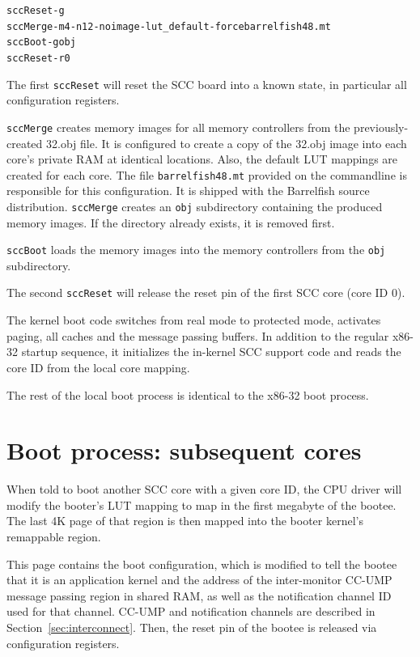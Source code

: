 \documentclass[a4paper,twoside]{report} %
\begin{document}
\begin{alltt}
  sccReset -g
  sccMerge -m4 -n12 -noimage -lut\_default -force barrelfish48.mt
  sccBoot -g obj
  sccReset -r 0
\end{alltt}

The first \texttt{sccReset} will reset the SCC board into a known
state, in particular all configuration registers.

\texttt{sccMerge} creates memory images for all memory controllers
from the previously-created 32.obj file. It is configured to create a
copy of the 32.obj image into each core's private RAM at identical
locations. Also, the default LUT mappings are created for each
core. The file \texttt{barrelfish48.mt} provided on the commandline is
responsible for this configuration. It is shipped with the Barrelfish
source distribution. \texttt{sccMerge} creates an \texttt{obj}
subdirectory containing the produced memory images. If the directory
already exists, it is removed first.

\texttt{sccBoot} loads the memory images into the memory controllers
from the \texttt{obj} subdirectory.

The second \texttt{sccReset} will release the reset pin of the first
SCC core (core ID 0).

The kernel boot code switches from real mode to protected mode,
activates paging, all caches and the message passing buffers. In
addition to the regular x86-32 startup sequence, it initializes the
in-kernel SCC support code and reads the core ID from the local core
mapping.

The rest of the local boot process is identical to the x86-32 boot
process.

\section{Boot process: subsequent cores}

When told to boot another SCC core with a given core ID, the CPU
driver will modify the booter's LUT mapping to map in the first
megabyte of the bootee. The last 4K page of that region is then mapped
into the booter kernel's remappable region.

This page contains the boot configuration, which is modified to tell
the bootee that it is an application kernel and the address of the
inter-monitor CC-UMP message passing region in shared RAM, as well as
the notification channel ID used for that channel. CC-UMP and
notification channels are described in Section~\ref{sec:interconnect}.
Then, the reset pin of the bootee is released via configuration
registers.
\end{document}
